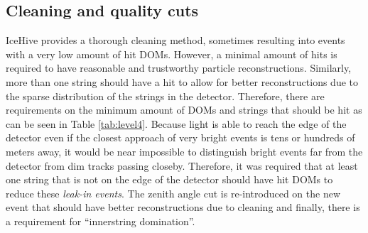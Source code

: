 \begin{table}[]
\caption{Overview of quality cuts in Level 4.}
\label{tab:level4}
\end{table}

\subsection{Cleaning and quality cuts}
\noindent IceHive provides a thorough cleaning method, sometimes resulting into events with a very low amount of hit DOMs. However, a minimal amount of hits is required to have reasonable and trustworthy particle reconstructions. Similarly, more than one string should have a hit to allow for better reconstructions due to the sparse distribution of the strings in the detector. Therefore, there are requirements on the minimum amount of DOMs and strings that should be hit as can be seen in Table \ref{tab:level4}. Because light is able to reach the edge of the detector even if the closest approach of very bright events is tens or hundreds of meters away, it would be near impossible to distinguish bright events far from the detector from dim tracks passing closeby. Therefore, it was required that at least one string that is not on the edge of the detector should have hit DOMs to reduce these \textit{leak-in events}.
The zenith angle cut is re-introduced on the new event that should have better reconstructions due to cleaning and finally, there is a requirement for ``innerstring domination''.


